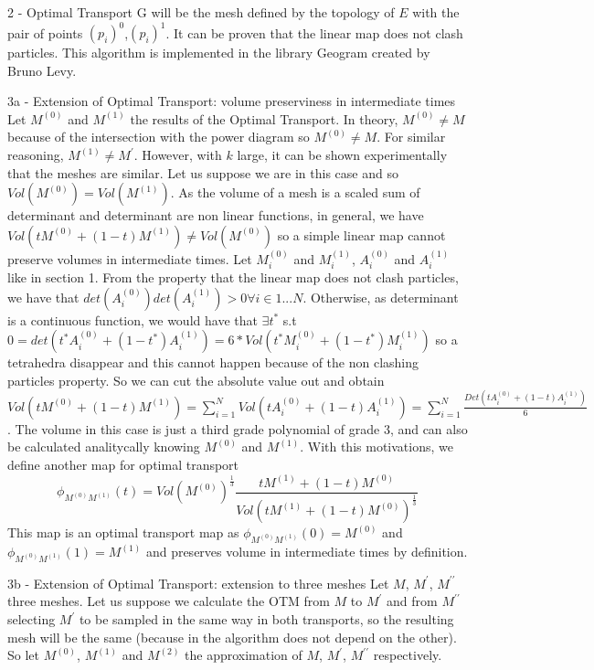\documentclass[b0paper,portrait]{baposter}
\begin{document}
\begin{poster}
\begin{posterbox}[name=otm,below=volume,span=6,column=0]{2
    - Optimal Transport }
G will be the mesh defined by the topology of $E$ with the pair of points $(p_{i})^{0}$,$(p_{i})^{1}$.
It can be proven that the linear map does not clash particles. This algorithm is implemented in the library Geogram created by Bruno Levy.
\end{posterbox}
\begin{posterbox}[name=otm2,below=otm,span=6,column=0]{3a
    - Extension of Optimal Transport: volume preserviness in intermediate times }
Let $M^{(0)}$ and $M^{(1)}$ the results of the Optimal Transport. In theory, $M^{(0)}\neq M$ because of the intersection with the power diagram so $M^{(0)}\neq M$. For similar reasoning, $M^{(1)}\neq M^{\prime}$. However, with $k$ large, it can be shown experimentally that the meshes are similar. Let us suppose we are in this case and so $Vol(M^{(0)})=Vol(M^{(1)})$. As the volume of a mesh is a scaled sum of determinant and determinant are non linear functions, in general, we have $Vol(tM^{(0)}+(1-t)M^{(1)})\neq Vol(M^{(0)})$ so a simple linear map cannot preserve volumes in intermediate times.
Let $M_{i}^{(0)}$ and $M_{i}^{(1)}$, $A_{i}^{(0)}$ and $A_{i}^{(1)}$ like in section 1. From the property that the linear map does not clash particles, we have that $det(A_{i}^{(0)})det(A_{i}^{(1)})>0 \forall i \in 1...N $. Otherwise, as determinant is a continuous function, we would have that $\exists t^{*}$ s.t $0=det(t^{*}A_{i}^{(0)}+(1-t^{*})A_{i}^{(1)})=6*Vol(t^{*}M_{i}^{(0)}+(1-t^{*})M_{i}^{(1)})$ so a tetrahedra disappear and this cannot happen because of the non clashing particles property. So we can cut the absolute value out and obtain $Vol(tM^{(0)}+(1-t)M^{(1)})=\sum \limits_{i=1}^{N} Vol(tA_{i}^{(0)}+(1-t)A_{i}^{(1)})=\sum \limits_{i=1}^{N} \frac{Det(tA_{i}^{(0)}+(1-t)A_{i}^{(1)})}{6}$. The volume in this case is just a third grade polynomial of grade $3$, and can also be calculated analitycally knowing $M^{(0)}$ and $M^{(1)}$.
With this motivations, we define another map for optimal transport $$\phi_{M^{(0)}M^{(1)}} (t)= {Vol(M^{(0)})}^{\frac{1}{3}}\frac{tM^{(1)}+(1-t)M^{(0)}}{Vol(tM^{(1)}+(1-t)M^{(0)})^{\frac{1}{3}}}$$
This map is an optimal transport map as $\phi_{M^{(0)}M^{(1)}}(0)=M^{(0)}$ and $\phi_{M^{(0)}M^{(1)}}(1)=M^{(1)}$ and preserves volume in intermediate times by definition.
\end{posterbox}
\begin{posterbox}[name=otm3,below=otm2,span=6,column=0]{3b
    - Extension of Optimal Transport: extension to three meshes }
Let $M$, $M^{\prime}$, $M^{\prime\prime}$ three meshes. Let us suppose we calculate the OTM from $M$ to $M^{\prime}$ and from $M^{\prime\prime}$ selecting  $M^{\prime}$ to be sampled in the same way in both transports, so the resulting mesh will be the same (because in the algorithm does not depend on the other). So let $M^{(0)}$, $M^{(1)}$ and $M^{(2)}$ the approximation of $M$, $M^{\prime}$, $M^{\prime\prime}$ respectively. 

\end{posterbox}
\end{poster}
\end{document}
